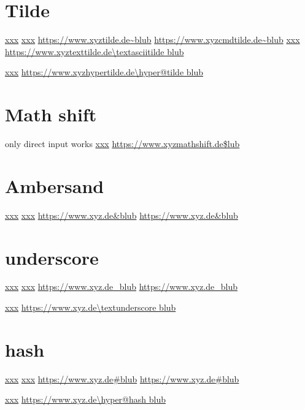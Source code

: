 \documentclass{article}
\begin{document}
\makeatother


\section{Tilde}

\href{https://www.xyztilde.de~blub}{xxx}
\href{https://www.xyzcmdtilde.de\~blub}{xxx}
\url{https://www.xyztilde.de~blub}
\url{https://www.xyzcmdtilde.de\~blub}
\href{https://www.xyztexttilde.de\textasciitilde blub}{xxx}
\url{https://www.xyztexttilde.de\textasciitilde blub}

\makeatletter
\href{https://www.xyzhypertilde.de\hyper@tilde blub}{xxx}
\url{https://www.xyzhypertilde.de\hyper@tilde blub}

\makeatother



\section{Math shift}
only direct input works
\href{https://www.xyzmathshift.de$blub}{xxx}
\url{https://www.xyzmathshift.de$lub}



\section{Ambersand}

\href{https://www.xyz.de&blub}{xxx}
\href{https://www.xyz.de\&blub}{xxx}
\url{https://www.xyz.de&blub}
\url{https://www.xyz.de\&blub}



\section{underscore}

\href{https://www.xyz.de_blub}{xxx}
\href{https://www.xyz.de\_blub}{xxx}
\url{https://www.xyz.de_blub}
\url{https://www.xyz.de\_blub}

\href{https://www.xyz.de\textunderscore blub}{xxx}
\url{https://www.xyz.de\textunderscore blub}





\section{hash}

\href{https://www.xyz.de#blub}{xxx}
\href{https://www.xyz.de\#blub}{xxx}
\url{https://www.xyz.de#blub}
\url{https://www.xyz.de\#blub}

\makeatletter
\href{https://www.xyz.de\hyper@hash blub}{xxx}
\url{https://www.xyz.de\hyper@hash blub}
\makeatother
\end{document}
